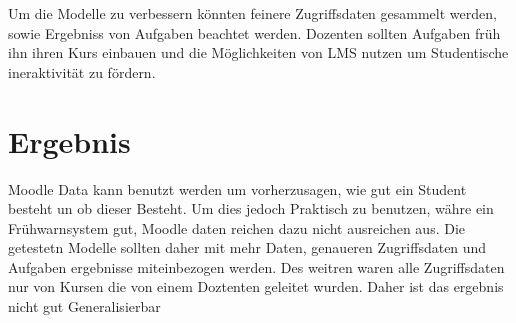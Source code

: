 Um die Modelle zu verbessern könnten feinere Zugriffsdaten gesammelt werden, sowie Ergebniss von Aufgaben beachtet werden. Dozenten sollten Aufgaben früh ihn ihren Kurs einbauen und die Möglichkeiten von LMS nutzen um Studentische ineraktivität zu fördern.


\section{Ergebnis}
Moodle Data kann benutzt werden um vorherzusagen, wie gut ein Student besteht un ob dieser Besteht. Um dies jedoch Praktisch zu benutzen, währe ein Frühwarnsystem gut, Moodle daten reichen dazu nicht ausreichen aus. 
Die getestetn Modelle sollten daher mit mehr Daten, genaueren Zugriffsdaten und Aufgaben ergebnisse miteinbezogen werden. 
Des weitren waren alle Zugriffsdaten nur von Kursen die von einem Doztenten geleitet wurden. Daher ist das ergebnis nicht gut Generalisierbar